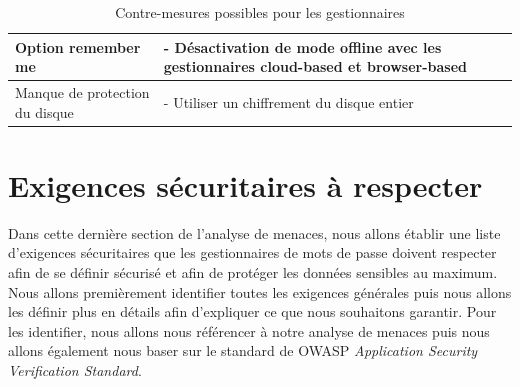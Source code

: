 \begin{table}[H]
{\begin{tabular}{l|l}
		\multicolumn{1}{l|}{Option remember me}  & \multicolumn{1}{l}{- Désactivation de mode offline avec les gestionnaires cloud-based et browser-based}                                                                                                                                                                                                                 \\ \hline
		Manque de protection du disque & - Utiliser un chiffrement du disque entier \\ \hline
	\end{tabular}}
\caption{Contre-mesures possibles pour les gestionnaires}
\end{table}

\section{Exigences sécuritaires à respecter} 
Dans cette dernière section de l'analyse de menaces, nous allons établir une liste d'exigences sécuritaires que les gestionnaires de mots de passe doivent respecter afin de se définir sécurisé et afin de protéger les données sensibles au maximum. Nous allons premièrement identifier toutes les exigences générales puis nous allons les définir plus en détails afin d'expliquer ce que nous souhaitons garantir.
Pour les identifier, nous allons nous référencer à notre analyse de menaces puis nous allons également nous baser sur le standard de OWASP \textit{Application Security Verification Standard}\cite{ASVS}. 
